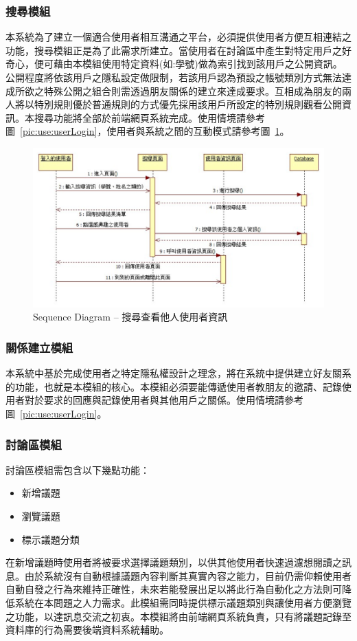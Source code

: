 \subsubsection{搜尋模組}
本系統為了建立一個適合使用者相互溝通之平台，必須提供使用者方便互相連結之功能，搜尋模組正是為了此需求所建立。當使用者在討論區中產生對特定用戶之好奇心，便可藉由本模組使用特定資料(如:學號)做為索引找到該用戶之公開資訊。公開程度將依該用戶之隱私設定做限制，若該用戶認為預設之帳號類別方式無法達成所欲之特殊公開之組合則需透過朋友關係的建立來達成要求。互相成為朋友的兩人將以特別規則優於普通規則的方式優先採用該用戶所設定的特別規則觀看公開資訊。本搜尋功能將全部於前端網頁系統完成。使用情境請參考圖~\ref{pic:use:userLogin}，使用者與系統之間的互動模式請參考圖~\ref{pic:seq:searchUser}。

\begin{figure}[H]
\centering
\includegraphics[width=\textwidth]{img/seq03.png}
\caption{Sequence Diagram -- 搜尋查看他人使用者資訊}
\label{pic:seq:searchUser}
\end{figure}

\subsubsection{關係建立模組}
本系統中基於完成使用者之特定隱私權設計之理念，將在系統中提供建立好友關系的功能，也就是本模組的核心。本模組必須要能傳遞使用者教朋友的邀請、記錄使用者對於要求的回應與記錄使用者與其他用戶之關係。使用情境請參考圖~\ref{pic:use:userLogin}。

\subsubsection{討論區模組}
討論區模組需包含以下幾點功能：
\begin{itemize}
\item 新增議題
\item 瀏覽議題
\item 標示議題分類
\end{itemize}
在新增議題時使用者將被要求選擇議題類別，以供其他使用者快速過濾想閱讀之訊息。由於系統沒有自動根據議題內容判斷其真實內容之能力，目前仍需仰賴使用者自動自發之行為來維持正確性，未來若能發展出足以將此行為自動化之方法則可降低系統在本問題之人力需求。此模組需同時提供標示議題類別與讓使用者方便瀏覽之功能，以達訊息交流之初衷。本模組將由前端網頁系統負責，只有將議題記錄至資料庫的行為需要後端資料系統輔助。

